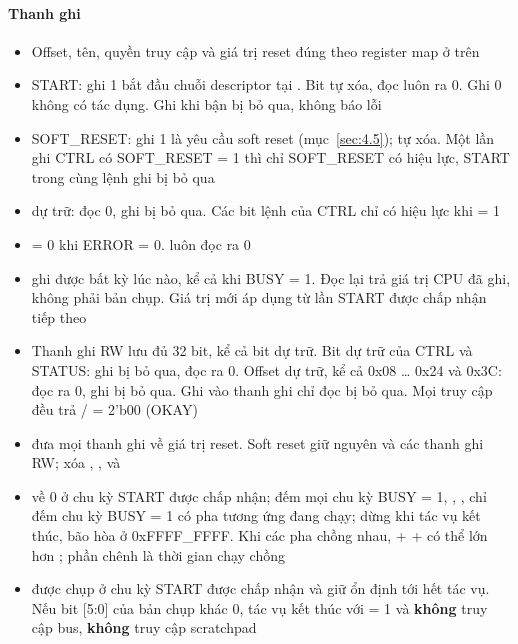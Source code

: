 \paragraph{Thanh ghi}\label{par:2-3}
\begin{itemize}
\item Offset, tên, quyền truy cập và giá trị reset đúng theo register map ở trên
\item {} START: ghi 1 bắt đầu chuỗi descriptor tại . Bit tự xóa, đọc luôn ra 0. Ghi 0 không có tác dụng. Ghi khi bận bị bỏ qua, không báo lỗi
\item {} SOFT\_RESET: ghi 1 là yêu cầu soft reset (mục~\ref{sec:4.5}); tự xóa. Một lần ghi CTRL có SOFT\_RESET = 1 thì chỉ SOFT\_RESET có hiệu lực, START trong cùng lệnh ghi bị bỏ qua
\item {} dự trữ: đọc 0, ghi bị bỏ qua. Các bit lệnh của CTRL chỉ có hiệu lực khi  = 1
\item {} = 0 khi ERROR = 0.  luôn đọc ra 0
\item {} ghi được bất kỳ lúc nào, kể cả khi BUSY = 1. Đọc lại trả giá trị CPU đã ghi, không phải bản chụp. Giá trị mới áp dụng từ lần START được chấp nhận tiếp theo
\item Thanh ghi RW lưu đủ 32 bit, kể cả bit dự trữ. Bit dự trữ của CTRL và STATUS: ghi bị bỏ qua, đọc ra 0. Offset dự trữ, kể cả 0x08 … 0x24 và 0x3C: đọc ra 0, ghi bị bỏ qua. Ghi vào thanh ghi chỉ đọc bị bỏ qua. Mọi truy cập đều trả  /  = 2'b00 (OKAY)
\item {} đưa mọi thanh ghi về giá trị reset. Soft reset giữ nguyên  và các thanh ghi RW; xóa , ,  và 
\item {} về 0 ở chu kỳ START được chấp nhận;  đếm mọi chu kỳ BUSY = 1, , ,  chỉ đếm chu kỳ BUSY = 1 có pha tương ứng đang chạy; dừng khi tác vụ kết thúc, bão hòa ở 0xFFFF\_FFFF. Khi các pha chồng nhau,  +  +  có thể lớn hơn ; phần chênh là thời gian chạy chồng
\item {} được chụp ở chu kỳ START được chấp nhận và giữ ổn định tới hết tác vụ. Nếu bit [5:0] của bản chụp khác 0, tác vụ kết thúc với  = 1 và \textbf{không} truy cập bus, \textbf{không} truy cập scratchpad
\end{itemize}

